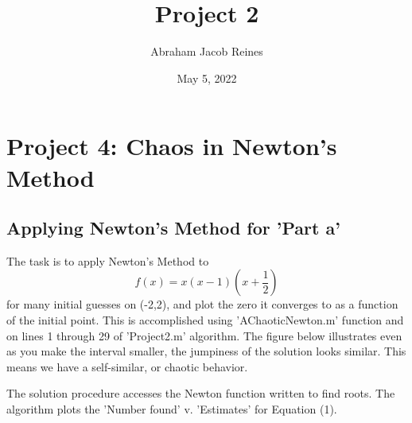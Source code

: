 \documentclass[12pt]{article} %
\title{{\bf{Project 2}}}
\author{Abraham Jacob Reines}
\date{May 5, 2022} %
\begin{document}
\maketitle
\hfill
\newpage

\section{Project 4: Chaos in Newton’s Method}
  \subsection{Applying Newton’s Method for 'Part a'}\par
  The task is to apply Newton’s Method to   
  \begin{equation}\label{eqn}  f(x) = x(x - 1)(x + \frac{1}{2})  \end{equation}
  for many  initial guesses on (-2,2), and plot the zero it converges to as a function of the initial point.  This is accomplished using 'AChaoticNewton.m' function and on lines 1 through 29 of 'Project2.m' algorithm.  The figure below illustrates even
as you make the interval smaller, the jumpiness of the solution looks similar.  This means we have a self-similar, or chaotic behavior.\par
The solution procedure accesses the Newton function written to find roots.  The algorithm plots the 'Number found' v. 'Estimates' for Equation (1).
\end{document}
